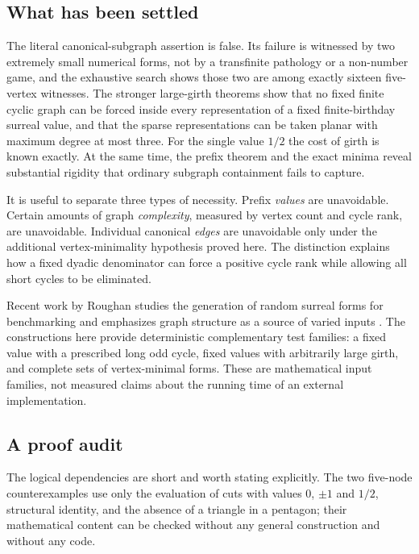 \documentclass[11pt,a4paper]{article}
\numberwithin{equation}{section}
\theoremstyle{definition}
\theoremstyle{remark}
\begin{document}
\subsection{What has been settled}

The literal canonical-subgraph assertion is false. Its failure is witnessed by
two extremely small numerical forms, not by a transfinite pathology or a
non-number game, and the exhaustive search shows those two are among exactly
sixteen five-vertex witnesses. The stronger large-girth theorems show that no
fixed finite cyclic graph can be forced inside every representation of a fixed
finite-birthday surreal value, and that the sparse representations can be
taken planar with maximum degree at most three. For the single value $1/2$ the cost of
girth is known exactly. At the same time, the prefix theorem and the exact
minima reveal substantial rigidity that ordinary subgraph containment fails to
capture.

It is useful to separate three types of necessity. Prefix \emph{values} are
unavoidable. Certain amounts of graph \emph{complexity}, measured by vertex
count and cycle rank, are unavoidable. Individual canonical \emph{edges} are
unavoidable only under the additional vertex-minimality hypothesis proved
here. The distinction explains how a fixed dyadic denominator can force a
positive cycle rank while allowing all short cycles to be eliminated.

Recent work by Roughan studies the generation of random surreal forms for
benchmarking and emphasizes graph structure as a source of varied inputs
\cite{Roughan2025}. The constructions here provide deterministic complementary
test families: a fixed value with a prescribed long odd cycle, fixed values
with arbitrarily large girth, and complete sets of vertex-minimal forms.
These are mathematical input families, not measured claims about the running
time of an external implementation.

\subsection{A proof audit}

The logical dependencies are short and worth stating explicitly. The two
five-node counterexamples use only the evaluation of cuts with values $0$, $\pm1$
and $1/2$, structural identity, and the absence of a triangle in a pentagon;
their mathematical content can be checked without any general construction and
without any code.
\end{document}
